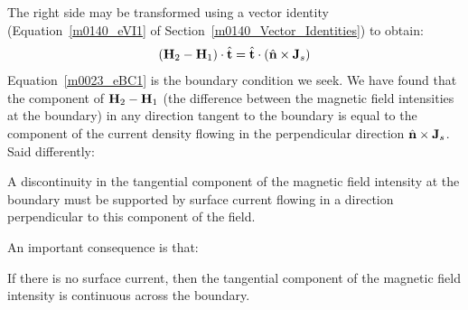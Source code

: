%
The right side may be transformed using a vector identity (Equation~\ref{m0140_eVI1} of Section~\ref{m0140_Vector_Identities}) to obtain:
% 
\begin{equation}   
\left( {\bf H}_2 -{\bf H}_1 \right) \cdot \hat{\bf t} = \hat{\bf t} \cdot \left( \hat{\bf n} \times {\bf J}_s \right)
\label{m0023_eBC1}
\end{equation}
%
Equation~\ref{m0023_eBC1} is the boundary condition we seek.  
We have found that the component of ${\bf H}_2 -{\bf H}_1$ (the difference between the magnetic field intensities at the boundary) in any direction tangent to the boundary is equal to the component of the current density flowing in the perpendicular direction $\hat{\bf n} \times {\bf J}_s$.  Said differently: 
%
\begin{mdframed}[backgroundcolor=yellow!20,nobreak=true] 
A discontinuity in the tangential component of the magnetic field intensity at the boundary must be supported by surface current flowing in a direction perpendicular to this component of the field.
\end{mdframed}
%
An important consequence is that:
%
\begin{mdframed}[backgroundcolor=yellow!20,nobreak=true] 
If there is no surface current, then the tangential component of the magnetic field intensity is continuous across the boundary.
\end{mdframed}

